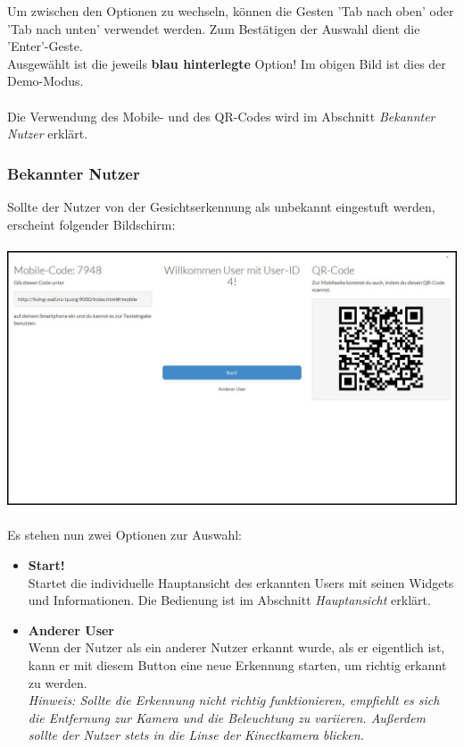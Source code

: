 \documentclass[10pt,a4paper]{report}
\begin{document}
		Um zwischen den Optionen zu wechseln, können die Gesten 'Tab nach oben' oder 'Tab nach unten' verwendet werden. Zum Bestätigen der Auswahl dient die 'Enter'-Geste.\\
Ausgewählt ist die jeweils \textbf{blau hinterlegte} Option! Im obigen Bild ist dies der Demo-Modus.\\ \\
Die Verwendung des Mobile- und des QR-Codes wird im Abschnitt \textit{Bekannter Nutzer} erklärt.
		\subsubsection{Bekannter Nutzer}
		Sollte der Nutzer von der Gesichtserkennung als unbekannt eingestuft werden, erscheint folgender Bildschirm:\\\\
		\includegraphics[scale=0.31]{Welcome}\\\\
		Es stehen nun zwei Optionen zur Auswahl:
			\begin{itemize}
				\item \textbf{Start!}\\
					Startet die individuelle Hauptansicht des erkannten Users mit seinen Widgets und Informationen. Die Bedienung ist im Abschnitt \textit{Hauptansicht} erklärt.
				\item \textbf{Anderer User}\\
				Wenn der Nutzer als ein anderer Nutzer erkannt wurde, als er eigentlich ist, kann er mit diesem Button eine neue Erkennung starten, um richtig erkannt zu werden.\\
				\textit{Hinweis: Sollte die Erkennung nicht richtig funktionieren, empfiehlt es sich die Entfernung zur Kamera und die Beleuchtung zu variieren. Außerdem sollte der Nutzer stets in die Linse der Kinectkamera blicken.}
			\end{itemize}
\end{document}
